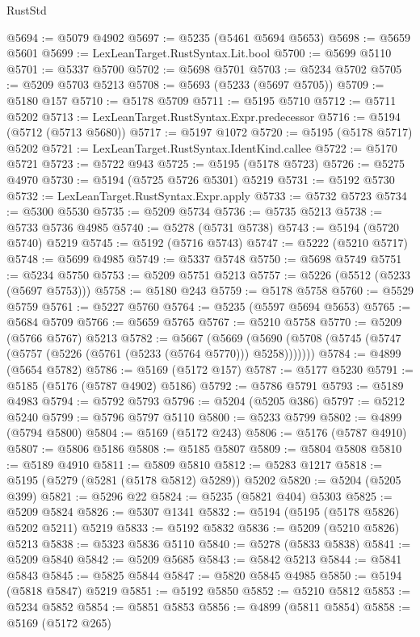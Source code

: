 \begin{lexlean}{RustStd}
\begin{coremodule}
@5694 := @5079 @4902
@5697 := @5235 (@5461 @5694 @5653)
@5698 := @5659 @5601
@5699 := LexLeanTarget.RustSyntax.Lit.bool
@5700 := @5699 @5110
@5701 := @5337 @5700
@5702 := @5698 @5701
@5703 := @5234 @5702
@5705 := @5209 @5703 @5213
@5708 := @5693 (@5233 (@5697 @5705))
@5709 := @5180 @157
@5710 := @5178 @5709
@5711 := @5195 @5710
@5712 := @5711 @5202
@5713 := LexLeanTarget.RustSyntax.Expr.predecessor
@5716 := @5194 (@5712 (@5713 @5680))
@5717 := @5197 @1072
@5720 := @5195 (@5178 @5717) @5202
@5721 := LexLeanTarget.RustSyntax.IdentKind.callee
@5722 := @5170 @5721
@5723 := @5722 @943
@5725 := @5195 (@5178 @5723)
@5726 := @5275 @4970
@5730 := @5194 (@5725 @5726 @5301) @5219
@5731 := @5192 @5730
@5732 := LexLeanTarget.RustSyntax.Expr.apply
@5733 := @5732 @5723
@5734 := @5300 @5530
@5735 := @5209 @5734
@5736 := @5735 @5213
@5738 := @5733 @5736 @4985
@5740 := @5278 (@5731 @5738)
@5743 := @5194 (@5720 @5740) @5219
@5745 := @5192 (@5716 @5743)
@5747 := @5222 (@5210 @5717)
@5748 := @5699 @4985
@5749 := @5337 @5748
@5750 := @5698 @5749
@5751 := @5234 @5750
@5753 := @5209 @5751 @5213
@5757 := @5226 (@5512 (@5233 (@5697 @5753)))
@5758 := @5180 @243
@5759 := @5178 @5758
@5760 := @5529 @5759
@5761 := @5227 @5760
@5764 := @5235 (@5597 @5694 @5653)
@5765 := @5684 @5709
@5766 := @5659 @5765
@5767 := @5210 @5758
@5770 := @5209 (@5766 @5767) @5213
@5782 := @5667
    (@5669 (@5690 (@5708 (@5745 (@5747 (@5757 (@5226 (@5761 (@5233 (@5764 @5770))) @5258)))))))
@5784 := @4899 (@5654 @5782)
@5786 := @5169 (@5172 @157)
@5787 := @5177 @5230
@5791 := @5185 (@5176 (@5787 @4902) @5186)
@5792 := @5786 @5791
@5793 := @5189 @4983
@5794 := @5792 @5793
@5796 := @5204 (@5205 @386)
@5797 := @5212 @5240
@5799 := @5796 @5797 @5110
@5800 := @5233 @5799
@5802 := @4899 (@5794 @5800)
@5804 := @5169 (@5172 @243)
@5806 := @5176 (@5787 @4910)
@5807 := @5806 @5186
@5808 := @5185 @5807
@5809 := @5804 @5808
@5810 := @5189 @4910
@5811 := @5809 @5810
@5812 := @5283 @1217
@5818 := @5195 (@5279 (@5281 (@5178 @5812) @5289)) @5202
@5820 := @5204 (@5205 @399)
@5821 := @5296 @22
@5824 := @5235 (@5821 @404) @5303
@5825 := @5209 @5824
@5826 := @5307 @1341
@5832 := @5194 (@5195 (@5178 @5826) @5202 @5211) @5219
@5833 := @5192 @5832
@5836 := @5209 (@5210 @5826) @5213
@5838 := @5323 @5836 @5110
@5840 := @5278 (@5833 @5838)
@5841 := @5209 @5840
@5842 := @5209 @5685
@5843 := @5842 @5213
@5844 := @5841 @5843
@5845 := @5825 @5844
@5847 := @5820 @5845 @4985
@5850 := @5194 (@5818 @5847) @5219
@5851 := @5192 @5850
@5852 := @5210 @5812
@5853 := @5234 @5852
@5854 := @5851 @5853
@5856 := @4899 (@5811 @5854)
@5858 := @5169 (@5172 @265)

\end{coremodule}
\end{lexlean}
